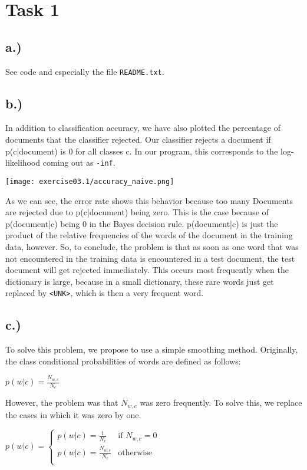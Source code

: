 \documentclass[%
   11pt,              %
   ngerman,           %
   a4paper,           %
   DIV11,             %
]{scrartcl}%
\begin{document}
\section*{Task 1}
\subsection*{a.)}

See code and especially the file \texttt{README.txt}.

\subsection*{b.)}

In addition to classification accuracy, we have also plotted the percentage
of documents that the classifier rejected. Our classifier rejects a document
if p(c|document) is 0 for all classes c. In our program, this corresponds to the log-likelihood coming out as \texttt{-inf}.

\texttt{[image: exercise03.1/accuracy\_naive.png]}

As we can see, the error rate shows this behavior because too many Documents are rejected due to p(c|document) being zero. This is the case because of p(document|c) being 0 in the Bayes decision rule. p(document|c) is just the product of the relative frequencies of the words of the document in the training data, however. So, to conclude, the problem is that as soon as one word that was not encountered in the training data is encountered in a test document, the test document will get rejected immediately. This occurs most frequently when the dictionary is large, because in a small dictionary, these rare words just get replaced by \texttt{<UNK>}, which is then a very frequent word.

\subsection*{c.)}

To solve this problem, we propose to use a simple smoothing method.
Originally, the class conditional probabilities of words are defined as follows:

$p(w|c) = \frac{N_{w,c}}{N_c}$

However, the problem was that $N_{w,c}$ was zero frequently. To solve this, we replace the cases in which it was zero by one.

$p(w|c) = \begin{cases} 
    p(w|c) = \frac{1}{N_c} & \text{if } N_{w,c} = 0\\
    p(w|c) = \frac{N_{w,c}}{N_c} & \text{otherwise}\\
\end{cases}$
\end{document}
